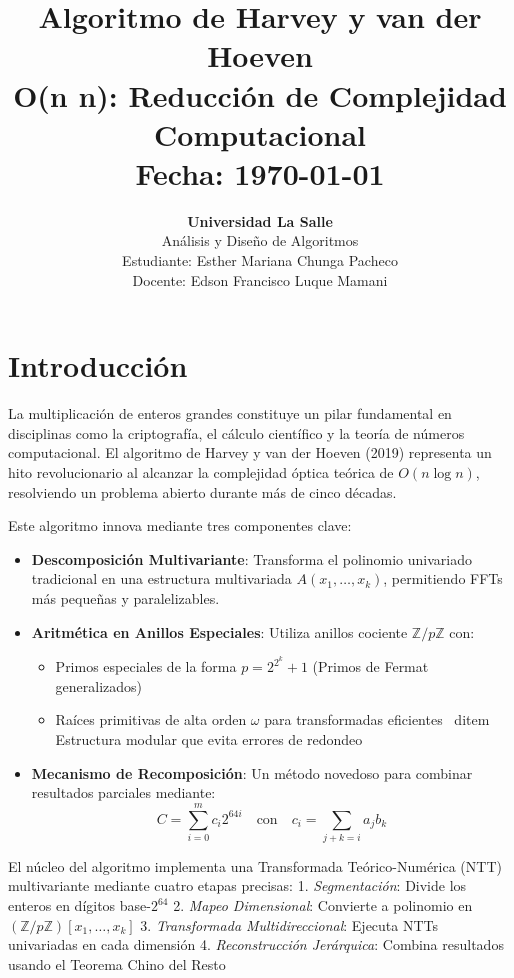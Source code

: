 \documentclass{article}
\title{%
\textbf{Algoritmo de Harvey y van der Hoeven} \\[0.4cm]
\large{O(n \log n): Reducción de Complejidad Computacional} \\[0.2cm]
\small{Fecha: \today}  %
}
\author{%
\textbf{Universidad La Salle} \\
Análisis y Diseño de Algoritmos \\
Estudiante: Esther Mariana Chunga Pacheco \\
Docente: Edson Francisco Luque Mamani \\
}
\date{}  %
\begin{document}
\maketitle



\setcounter{tocdepth}{3}  %
\renewcommand{\contentsname}{Índice General}

\tableofcontents
\newpage
\section{Introducción}
La multiplicación de enteros grandes constituye un pilar fundamental en disciplinas como la criptografía, el cálculo científico y la teoría de números computacional. El algoritmo de Harvey y van der Hoeven (2019) representa un hito revolucionario al alcanzar la complejidad óptica teórica de \( O(n \log n) \), resolviendo un problema abierto durante más de cinco décadas.

Este algoritmo innova mediante tres componentes clave:
\begin{itemize}
    \item \textbf{Descomposición Multivariante}: Transforma el polinomio univariado tradicional en una estructura multivariada \( A(x_1,\ldots,x_k) \), permitiendo FFTs más pequeñas y paralelizables.
    
    \item \textbf{Aritmética en Anillos Especiales}: Utiliza anillos cociente \( \mathbb{Z}/p\mathbb{Z} \) con:
    \begin{itemize}
        \item Primos especiales de la forma \( p = 2^{2^k} + 1 \) (Primos de Fermat generalizados)
        \item Raíces primitivas de alta orden \( \omega \) para transformadas eficientes
        \ ditem Estructura modular que evita errores de redondeo
    \end{itemize}
    
    \item \textbf{Mecanismo de Recomposición}: Un método novedoso para combinar resultados parciales mediante:
    \begin{equation}
        C = \sum_{i=0}^{m} c_i 2^{64i} \quad \text{con} \quad c_i = \sum_{j+k=i} a_jb_k
    \end{equation}
\end{itemize}

El núcleo del algoritmo implementa una Transformada Teórico-Numérica (NTT) multivariante mediante cuatro etapas precisas:
1. \textit{Segmentación}: Divide los enteros en dígitos base-\( 2^{64} \)
2. \textit{Mapeo Dimensional}: Convierte a polinomio en \( (\mathbb{Z}/p\mathbb{Z})[x_1,\ldots,x_k] \)
3. \textit{Transformada Multidireccional}: Ejecuta NTTs univariadas en cada dimensión
4. \textit{Reconstrucción Jerárquica}: Combina resultados usando el Teorema Chino del Resto
\end{document}

